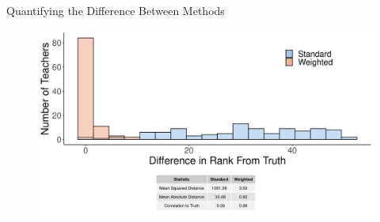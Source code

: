 \documentclass[t,aspectratio=169,11pt]{beamer}
\begin{document}

\begin{frame}{Quantifying the Difference Between Methods} 

\vfill
\begin{figure}
    \centering
    \includegraphics[width=.75\linewidth]{slides/CIERS_Figures/hist_run_2.png}
\end{figure}

\end{frame}


\end{document}
